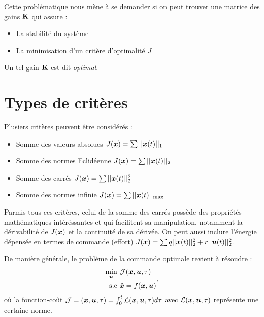 Cette problématique nous mène à se demander si on peut trouver une matrice des gains $\mathbf{K}$ qui assure  :
\begin{itemize}
	\item La stabilité du système
	\item La minimisation d'un critère d'optimalité $J$
\end{itemize}
Un tel gain $\mathbf{K}$ est dit \emph{optimal}. 

\section{Types de critères}
Plusiers critères  peuvent être considérés :
\begin{itemize}
	\item Somme des valeurs absolues $J(\bm{x}) = \sum ||\bm{x}(t)||_1$
	\item Somme des normes Eclidéenne $J(\bm{x}) = \sum ||\bm{x}(t)||_2$
	\item Somme des carrés $J(\bm{x}) = \sum ||\bm{x}(t)||_2^2$
	\item Somme des normes infinie $J(\bm{x}) = \sum ||\bm{x}(t)||_{\max}$
\end{itemize}
Parmis tous ces critères, celui de la somme des carrés possède des propriétés mathématiques intéréssantes et qui facilitent sa manipulation, notamment la dérivabilité de $J(\bm{x})$ et la continuité de sa dérivée. On peut aussi inclure l'énergie dépensée en termes de commande (effort) $J(\bm{x}) = \sum q||\bm{x}(t)||_2^2 + r||\bm{u}(t)||_2^2$. 

De manière générale, le problème de la commande optimale revient à résoudre :
\begin{align}\label{eq-chap2:gen optimal problem}
	\begin{split}
		\underset{\bm{u}}{\min}~&{\cal J}(\bm{x},\bm{u},\tau) \\
		{\rm s.c}~&\bm{\dot{x}} = f(\bm{x},\bm{u})
	\end{split},
\end{align}
où la fonction-coût ${\cal J}=(\bm{x},\bm{u},\tau) = \int_0^t{\cal L}(\bm{x},\bm{u},\tau)d\tau$ avec ${\cal L}(\bm{x},\bm{u},\tau)$ représente une certaine norme.

